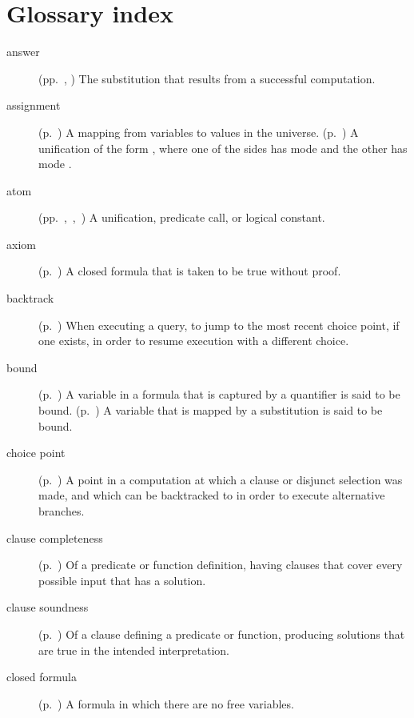 \chapter{Glossary index}
\label{sec:glossary}

\begin{description}

\item[answer]
(pp.~\pageref{gi:answer}, \pageref{gi:answer2})
The substitution that results from a successful computation.

\item[assignment]
(p.~\pageref{sec:assignments})
A mapping from variables to values in the universe.
(p.~\pageref{gi:assignment})
A unification of the form ,
where one of the sides has mode 
and the other has mode .

\item[atom]
(pp.~\pageref{gi:atom},~\pageref{gi:atom2},~\pageref{gi:atom3})
A unification, predicate call, or logical constant.

\item[axiom]
(p.~\pageref{gi:axiom})
A closed formula that is taken to be true without proof.

\item[backtrack]
(p.~\pageref{gi:backtrack})
When executing a query,
to jump to the most recent choice point,
if one exists,
in order to resume execution
with a different choice.

\item[bound]
(p.~\pageref{gi:bound})
A variable in a formula that is captured by a quantifier
is said to be bound.
(p.~\pageref{gi:bound2})
A variable that is mapped by a substitution is said to be bound.

\item[choice point]
(p.~\pageref{gi:choice-point})
A point in a computation at which a clause or disjunct selection was made,
and which can be backtracked to in order to execute alternative branches.

\item[clause completeness]
(p.~\pageref{gi:clause-completeness})
Of a predicate or function definition,
having clauses that cover every possible input that has a solution.

\item[clause soundness]
(p.~\pageref{gi:clause-soundness})
Of a clause defining a predicate or function,
producing solutions that are true in the intended interpretation.

\item[closed formula]
(p.~\pageref{gi:closed-formula})
A formula in which there are no free variables.


\end{description}
